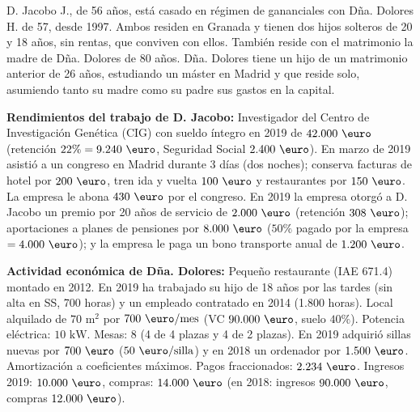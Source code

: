\documentclass[11pt,a4paper,openany]{article}
\begin{document}
\begin{enunciadoBox}
D. Jacobo J., de 56 años, está casado en régimen de gananciales con Dña. Dolores H. de 57, desde 1997. Ambos residen en Granada y tienen dos hijos solteros de 20 y 18 años, sin rentas, que conviven con ellos. También reside con el matrimonio la madre de Dña. Dolores de 80 años. Dña. Dolores tiene un hijo de un matrimonio anterior de 26 años, estudiando un máster en Madrid y que reside solo, asumiendo tanto su madre como su padre sus gastos en la capital.

\textbf{Rendimientos del trabajo de D. Jacobo:} Investigador del Centro de Investigación Genética (CIG) con sueldo íntegro en 2019 de $42.000\text{ \euro}$ (retención $22\% = 9.240\text{ \euro}$, Seguridad Social $2.400\text{ \euro}$). En marzo de 2019 asistió a un congreso en Madrid durante 3 días (dos noches); conserva facturas de hotel por $200\text{ \euro}$, tren ida y vuelta $100\text{ \euro}$ y restaurantes por $150\text{ \euro}$. La empresa le abona $430\text{ \euro}$ por el congreso.
En 2019 la empresa otorgó a D. Jacobo un premio por 20 años de servicio de $2.000\text{ \euro}$ (retención $308\text{ \euro}$); aportaciones a planes de pensiones por $8.000\text{ \euro}$ ($50\%$ pagado por la empresa $= 4.000\text{ \euro}$); y la empresa le paga un bono transporte anual de $1.200\text{ \euro}$.

\textbf{Actividad económica de Dña. Dolores:} Pequeño restaurante (IAE 671.4) montado en 2012. En 2019 ha trabajado su hijo de 18 años por las tardes (sin alta en SS, 700 horas) y un empleado contratado en 2014 (1.800 horas). Local alquilado de $70\text{ m}^2$ por $700\text{ \euro/mes}$ (VC $90.000\text{ \euro}$, suelo $40\%$). Potencia eléctrica: $10\text{ kW}$. Mesas: 8 (4 de 4 plazas y 4 de 2 plazas). En 2019 adquirió sillas nuevas por $700\text{ \euro}$ ($50\text{ \euro/silla}$) y en 2018 un ordenador por $1.500\text{ \euro}$. Amortización a coeficientes máximos. Pagos fraccionados: $2.234\text{ \euro}$. Ingresos 2019: $10.000\text{ \euro}$, compras: $14.000\text{ \euro}$ (en 2018: ingresos $90.000\text{ \euro}$, compras $12.000\text{ \euro}$).


\end{enunciadoBox}
\end{document}
